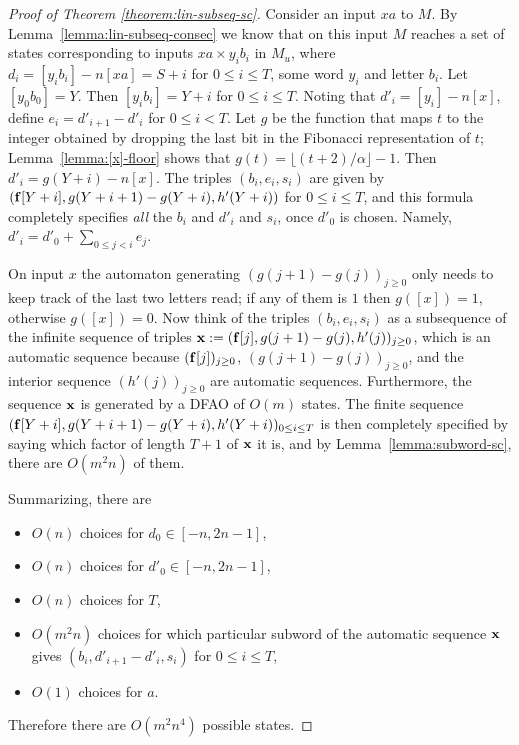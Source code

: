 \documentclass[10pt,a4paper]{amsart}
\begin{document}
\begin{proof}[Proof of Theorem \ref{theorem:lin-subseq-sc}]
Consider an input $xa$ to $M$.
By Lemma~\ref{lemma:lin-subseq-consec} we know that
on this input $M$ reaches a set of
states corresponding to inputs $xa\times y_i b_i$ in $M_u$, where $d_i = [y_i b_i]-n[xa]=  S+i$  for
$0 \leq i \leq T$, some word $y_i$ and letter $b_i$.  Let $[y_0 b_0] = Y$.  Then $[y_i b_i] = Y+i$
for $0 \leq i \leq T$.  Noting that
$d'_i = [y_i] - n[x]$, 
define $e_i = d'_{i+1} - d'_i$ for $0 \leq i < T$. 
Let $g$ be the function that
maps $t$ to the integer obtained by dropping the last
bit in the Fibonacci representation of $t$; Lemma~\ref{lemma:[x]-floor}
shows that $g(t) = \lfloor (t+2)/\alpha \rfloor - 1$.
Then $d'_i = g(Y+i) -n[x]$.
The triples $(b_i, e_i, s_i )$ are given by $({\bf f}[Y+i], g(Y+i+1)-g(Y+i), h'(Y+i))$
for $0 \leq i \leq T$, and this formula completely specifies {\it all\/} the $b_i$ and $d'_i$ and $s_i$,
once $d'_0$ is chosen.  Namely,
$d'_i = d'_0 + \sum_{0 \leq j < i} e_j$.

On input $x$ the automaton generating $(g(j+1)-g(j))_{j \geq 0}$ only needs to keep track of the last two letters read; if any of them is $1$ then $g([x]) = 1$, otherwise $g([x]) =0$. 
Now think of the triples $(b_i, e_i, s_i)$  as a subsequence of the infinite sequence of triples 
${\bf x} := ({\bf f}[j], g(j+1)-g(j), h'(j))_{j\geq 0}$, which 
is an automatic sequence because $({\bf f}[j])_{j \geq 0}$, $(g(j+1)-g(j))_{j \geq 0}$, and the interior sequence $(h'(j))_{j\geq 0}$ are automatic sequences.
Furthermore, the sequence ${\bf x}$ is generated by a DFAO of $O(m)$ states.
The finite sequence
$({\bf f}[Y+i], g(Y+i+1)-g(Y+i), h'(Y+i))_{0 \leq i \leq T}$ is then completely specified by saying which factor of length $T+1$ of $\bf x$ it is, and by
Lemma~\ref{lemma:subword-sc}, there are $O(m^2n)$ of them.

Summarizing, there are
\begin{itemize}
\item[(a)] $O(n)$ choices for $d_0 \in [-n, 2n-1]$,
\item[(b)] $O(n)$ choices for $d'_0 \in [-n, 2n-1]$,
\item[(c)] $O(n)$ choices for $T$,
\item[(d)] $O(m^2n)$ choices for which particular subword of the automatic sequence $\bf x$ gives $(b_i, d'_{i+1}-d'_i, s_i)$ for $0 \leq i \leq T$,
\item[(e)] $O(1)$ choices for $a$.
\end{itemize}

Therefore there are $O(m^2n^4)$ possible states.
\end{proof}
\end{document}
